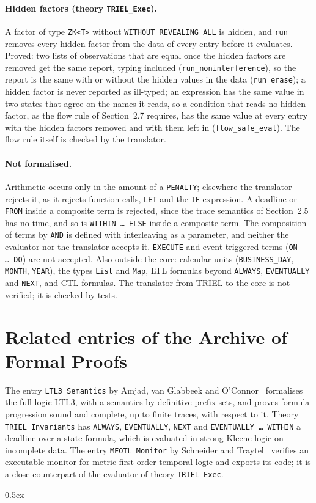 \documentclass[11pt,a4paper]{article}
\begin{document}
\paragraph{Hidden factors (theory \texttt{TRIEL\_Exec}).}
A factor of type \texttt{ZK<T>} without \texttt{WITHOUT REVEALING ALL} is hidden, and
\texttt{run} removes every hidden factor from the data of every entry before it
evaluates. Proved: two lists of observations that are equal once the hidden factors are
removed get the same report, typing included (\texttt{run\_noninterference}), so the
report is the same with or without the hidden values in the data (\texttt{run\_erase}); a
hidden factor is never reported as ill-typed; an expression has the same value in two
states that agree on the names it reads, so a condition that reads no hidden factor, as
the flow rule of Section~2.7 requires, has the same value at every entry with the hidden
factors removed and with them left in (\texttt{flow\_safe\_eval}). The flow rule itself is
checked by the translator.

\paragraph{Not formalised.}
Arithmetic occurs only in the amount of a \texttt{PENALTY}; elsewhere the translator
rejects it, as it rejects function calls, \texttt{LET} and the \texttt{IF} expression. A
deadline or \texttt{FROM} inside a composite term is rejected, since the trace semantics
of Section~2.5 has no time, and so is \texttt{WITHIN \dots\ ELSE} inside a composite term.
The composition of terms by \texttt{AND} is defined with interleaving as a parameter, and
neither the evaluator nor the translator accepts it. \texttt{EXECUTE} and event-triggered
terms (\texttt{ON \dots\ DO}) are not accepted. Also outside the core: calendar units
(\texttt{BUSINESS\_DAY}, \texttt{MONTH}, \texttt{YEAR}), the types \texttt{List} and
\texttt{Map}, LTL formulas beyond \texttt{ALWAYS}, \texttt{EVENTUALLY} and \texttt{NEXT},
and CTL formulas. The translator from TRIEL to the core is not verified; it is checked
by tests.

\section*{Related entries of the Archive of Formal Proofs}

The entry \texttt{LTL3\_Semantics} by Amjad, van Glabbeek and
O'Connor~\cite{LTL3Semantics-AFP} formalises the full logic LTL3, with a semantics by
definitive prefix sets, and proves formula progression sound and complete, up to finite
traces, with respect to it. Theory \texttt{TRIEL\_Invariants} has \texttt{ALWAYS},
\texttt{EVENTUALLY}, \texttt{NEXT} and \texttt{EVENTUALLY \dots\ WITHIN} a deadline over a
state formula, which is evaluated in strong Kleene logic on incomplete data. The entry
\texttt{MFOTL\_Monitor} by Schneider and Traytel~\cite{MFOTLMonitor-AFP} verifies an
executable monitor for metric first-order temporal logic and exports its code; it is a
close counterpart of the evaluator of theory \texttt{TRIEL\_Exec}.

\newpage
\tableofcontents
\newpage

\parindent 0pt\parskip 0.5ex





\end{document}
